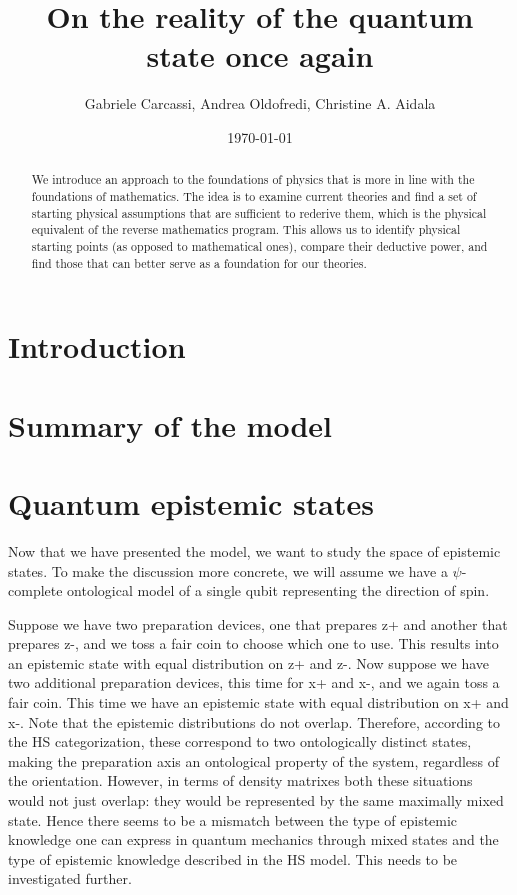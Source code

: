 \documentclass[10pt,twocolumn, nofootinbib]{revtex4-2}
\begin{document}
\title{On the reality of the quantum state once again}
\author{Gabriele Carcassi, Andrea Oldofredi, Christine A. Aidala}

\date{\today}


\begin{abstract}
We introduce an approach to the foundations of physics that is more in line with the foundations of mathematics. The idea is to examine current theories and find a set of starting physical assumptions that are sufficient to rederive them, which is the physical equivalent of the reverse mathematics program. This allows us to identify physical starting points (as opposed to mathematical ones), compare their deductive power, and find those that can better serve as a foundation for our theories.
\end{abstract}

\maketitle

\section{Introduction}

\section{Summary of the model}

\section{Quantum epistemic states}
Now that we have presented the model, we want to study the space of epistemic states. To make the discussion more concrete, we will assume we have a $\psi$-complete ontological model of a single qubit representing the direction of spin.

Suppose we have two preparation devices, one that prepares z+ and another that prepares z-, and we toss a fair coin to choose which one to use. This results into an epistemic state with equal distribution on z+ and z-. Now suppose we have two additional preparation devices, this time for x+ and x-, and we again toss a fair coin. This time we have an epistemic state with equal distribution on x+ and x-. Note that the epistemic distributions do not overlap. Therefore, according to the HS categorization, these correspond to two ontologically distinct states, making the preparation axis an ontological property of the system, regardless of the orientation. However, in terms of density matrixes both these situations would not just overlap: they would be represented by the same maximally mixed state. Hence there seems to be a mismatch between the type of epistemic knowledge one can express in quantum mechanics through mixed states and the type of epistemic knowledge described in the HS model. This needs to be investigated further.
\end{document}
